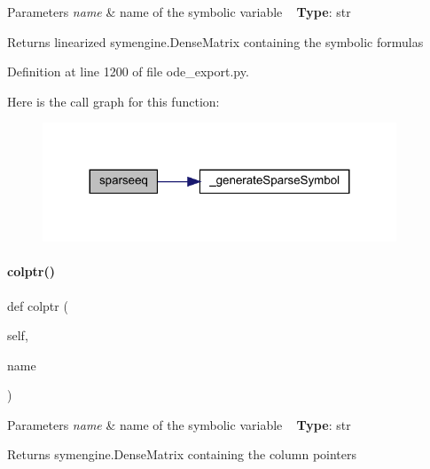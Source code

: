 \begin{DoxyParams}{Parameters}
{\em name} & name of the symbolic variable ~\newline
{\bfseries{Type}}\+: str\\
\hline
\end{DoxyParams}
\begin{DoxyReturn}{Returns}
linearized symengine.\+Dense\+Matrix containing the symbolic formulas 
\end{DoxyReturn}


Definition at line 1200 of file ode\+\_\+export.\+py.

Here is the call graph for this function\+:
\nopagebreak
\begin{figure}[H]
\begin{center}
\leavevmode
\includegraphics[width=299pt]{classamici_1_1ode__export_1_1_o_d_e_model_ade69c458d3c7069f0b062d796f68d1da_cgraph}
\end{center}
\end{figure}
\mbox{\label{classamici_1_1ode__export_1_1_o_d_e_model_ad478875583922ae8d579486a03107557}} 
\paragraph{\texorpdfstring{colptr()}{colptr()}}
{\footnotesize\ttfamily def colptr (\begin{DoxyParamCaption}\item[{}]{self,  }\item[{}]{name }\end{DoxyParamCaption})}


\begin{DoxyParams}{Parameters}
{\em name} & name of the symbolic variable ~\newline
{\bfseries{Type}}\+: str\\
\hline
\end{DoxyParams}
\begin{DoxyReturn}{Returns}
symengine.\+Dense\+Matrix containing the column pointers 
\end{DoxyReturn}



